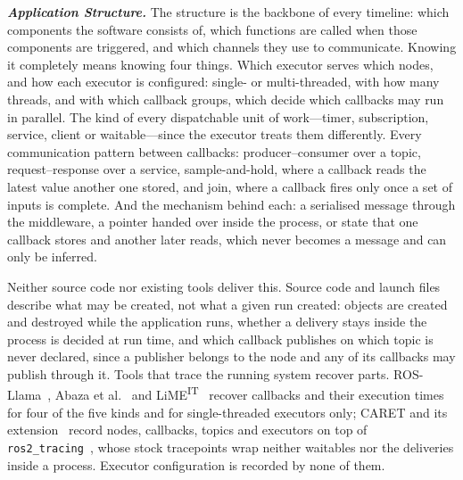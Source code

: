 \noindent
\textit{\textbf{Application Structure.}}
The structure is the backbone of every timeline: which components the software consists of, which functions are called when those components are triggered, and which channels they use to communicate. Knowing it completely means knowing four things. Which executor serves which nodes, and how each executor is configured: single- or multi-threaded, with how many threads, and with which callback groups, which decide which callbacks may run in parallel. The kind of every dispatchable unit of work---timer, subscription, service, client or waitable---since the executor treats them differently. Every communication pattern between callbacks: producer--consumer over a topic, request--response over a service, sample-and-hold, where a callback reads the latest value another one stored, and join, where a callback fires only once a set of inputs is complete. And the mechanism behind each: a serialised message through the middleware, a pointer handed over inside the process, or state that one callback stores and another later reads, which never becomes a message and can only be inferred.

Neither source code nor existing tools deliver this. Source code and launch files describe what may be created, not what a given run created: objects are created and destroyed while the application runs, whether a delivery stays inside the process is decided at run time, and which callback publishes on which topic is never declared, since a publisher belongs to the node and any of its callbacks may publish through it. Tools that trace the running system recover parts. ROS-Llama~\cite{blass-2021-rosllama-paper}, Abaza et al.~\cite{abaza-2024-ros2modelsynthesis} and LiME\textsuperscript{IT}~\cite{brandenburg-2026-limeit} recover callbacks and their execution times for four of the five kinds and for single-threaded executors only; CARET and its extension~\cite{kuboichi-2022-caret,peng-2022-caretcomp} record nodes, callbacks, topics and executors on top of \texttt{ros2\_tracing}~\cite{bedard-2022-ros2tracing}, whose stock tracepoints wrap neither waitables nor the deliveries inside a process. Executor configuration is recorded by none of them.

